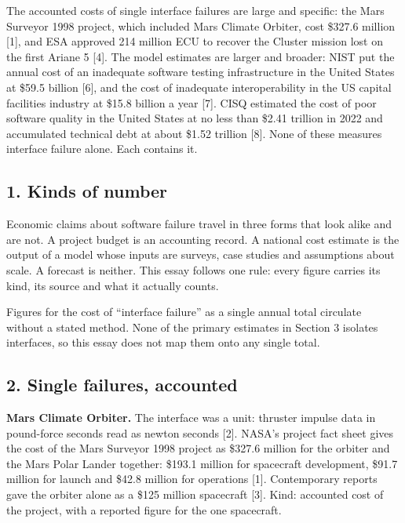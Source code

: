 \documentclass[
  10pt,
]{article}
\begin{document}
The accounted costs of single interface failures are large and specific:
the Mars Surveyor 1998 project, which included Mars Climate Orbiter,
cost \$327.6 million {[}1{]}, and ESA approved 214 million ECU to
recover the Cluster mission lost on the first Ariane 5 {[}4{]}. The
model estimates are larger and broader: NIST put the annual cost of an
inadequate software testing infrastructure in the United States at
\$59.5 billion {[}6{]}, and the cost of inadequate interoperability in
the US capital facilities industry at \$15.8 billion a year {[}7{]}.
CISQ estimated the cost of poor software quality in the United States at
no less than \$2.41 trillion in 2022 and accumulated technical debt at
about \$1.52 trillion {[}8{]}. None of these measures interface failure
alone. Each contains it.

\subsection{1. Kinds of number}\label{kinds-of-number}

Economic claims about software failure travel in three forms that look
alike and are not. A project budget is an accounting record. A national
cost estimate is the output of a model whose inputs are surveys, case
studies and assumptions about scale. A forecast is neither. This essay
follows one rule: every figure carries its kind, its source and what it
actually counts.

Figures for the cost of ``interface failure'' as a single annual total
circulate without a stated method. None of the primary estimates in
Section 3 isolates interfaces, so this essay does not map them onto any
single total.

\subsection{2. Single failures,
accounted}\label{single-failures-accounted}

\textbf{Mars Climate Orbiter.} The interface was a unit: thruster
impulse data in pound-force seconds read as newton seconds {[}2{]}.
NASA's project fact sheet gives the cost of the Mars Surveyor 1998
project as \$327.6 million for the orbiter and the Mars Polar Lander
together: \$193.1 million for spacecraft development, \$91.7 million for
launch and \$42.8 million for operations {[}1{]}. Contemporary reports
gave the orbiter alone as a \$125 million spacecraft {[}3{]}. Kind:
accounted cost of the project, with a reported figure for the one
spacecraft.
\end{document}
